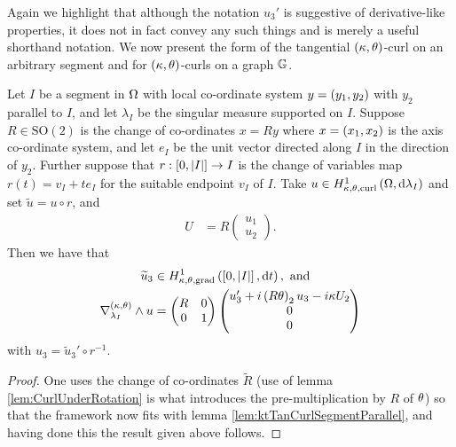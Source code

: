 Again we highlight that although the notation $u_3'$ is suggestive of derivative-like properties, it does not in fact convey any such things and is merely a useful shorthand notation.
We now present the form of the tangential $\left( \kappa, \theta \right)$-curl on an arbitrary segment and for $\left( \kappa, \theta \right)$-curls on a graph $\mathbb{G}$.
\begin{lemma} \label{ktTanCurlGeneralSegment}
	Let $I$ be a segment in $\Omega$ with local co-ordinate system $y=\left( y_1,y_2 \right)$ with $y_2$ parallel to $I$, and let $\lambda_I$ be the singular measure supported on $I$.
	Suppose $R\in\mathrm{SO}(2)$ is the change of co-ordinates $x=Ry$ where $x=\left( x_1,x_2 \right)$ is the axis co-ordinate system, and let $e_I$ be the unit vector directed along $I$ in the direction of $y_2$.
	Further suppose that $r:\left[ 0,\left\lvert I \right\rvert \right]\rightarrow I$ is the change of variables map $r(t) = v_I + te_I$ for the suitable endpoint $v_I$ of $I$.
	Take $u\in H^1_{\kappa,\theta,\mathrm{curl}}\left( \Omega, \mathrm{d}\lambda_I \right)$ and set $\widetilde{u} = u \circ r$, and
	\begin{align*}
		U &= R\begin{pmatrix} u_1 \\ u_2 \end{pmatrix}.
	\end{align*}
	Then we have that 
	\begin{align*}
		\widetilde{u}_3 &\in H^1_{\kappa,\theta,\mathrm{grad}}\left( \left[ 0,\left\lvert I \right\rvert \right], \mathrm{d}t \right), \text{ and }\\
		\nabla_{\lambda_I}^{\left( \kappa, \theta \right)}\wedge u &= \begin{pmatrix} R & 0 \\ 0 & 1 \end{pmatrix} \begin{pmatrix} u_3' + i\left( R\theta \right)_2u_3 - i\kappa U_2 \\ 0 \\ 0 \end{pmatrix}
	\end{align*}
	with $u_3 = \widetilde{u}_3' \circ r^{-1}$.
\end{lemma}
\begin{proof}
	One uses the change of co-ordinates $\widetilde{R}$ (use of lemma  \ref{lem:CurlUnderRotation} is what introduces the pre-multiplication by $R$ of $\theta$) so that the framework now fits with lemma \ref{lem:ktTanCurlSegmentParallel}, and having done this the result given above follows.
\end{proof}

